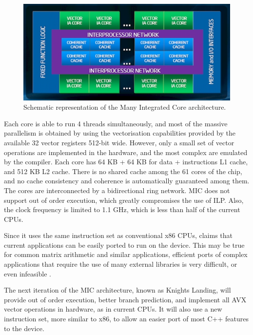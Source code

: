 \begin{figure}[!htp]
	\begin{center}
		\includegraphics[scale=0.65]{imgs/mic.png}
		\caption{Schematic representation of the \intel Many Integrated Core architecture.}
		\label{fig:mic}
	\end{center}
\end{figure}

Each core is able to run 4 threads simultaneously, and most of the massive parallelism is obtained by using the vectorisation capabilities provided by the available 32 vector registers 512-bit wide. However, only a small set of vector operations are implemented in the hardware, and the most complex are emulated by the compiler. Each core has 64 KB + 64 KB for data + instructions L1 cache, and 512 KB L2 cache. There is no shared cache among the 61 cores of the chip, and no cache consistency and coherence is automatically guaranteed among them. The cores are interconnected by a bidirectional ring network. MIC does not support out of order execution, which greatly compromises the use of ILP. Also, the clock frequency is limited to 1.1 GHz, which is less than half of the current CPUs.

Since it uses the same instruction set as conventional x86 CPUs, \intel claims that current applications can be easily ported to run on the device. This may be true for common matrix arithmetic and similar applications, efficient ports of complex applications that require the use of many external libraries is very difficult, or even infeasible \cite{Msc:AMP}.

The next iteration of the MIC architecture, known as Knights Landing, will provide out of order execution, better branch prediction, and implement all AVX vector operations in hardware, as in current \intel CPUs. It will also use a new instruction set, more similar to x86, to allow an easier port of most C++ features to the device.

